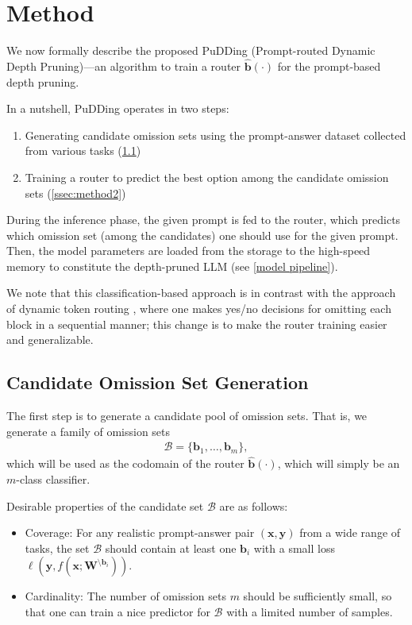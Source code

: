

\section{Method}\label{sec:method}
We now formally describe the proposed PuDDing (Prompt-routed Dynamic Depth Pruning)---an algorithm to train a router $\hat{\mathbf{b}}(\cdot)$ for the prompt-based depth pruning.

In a nutshell, PuDDing operates in two steps:
\begin{enumerate}[leftmargin=*,topsep=0pt,parsep=0pt,itemsep=1.5pt]
\item Generating candidate omission sets using the prompt-answer dataset collected from various tasks (\cref{ssec:method1})
\item Training a router to predict the best option among the candidate omission sets (\cref{ssec:method2})
\end{enumerate}

During the inference phase, the given prompt is fed to the router, which predicts which omission set (among the candidates) one should use for the given prompt. Then, the model parameters are loaded from the storage to the high-speed memory to constitute the depth-pruned LLM (see \cref{model pipeline}).

We note that this classification-based approach is in contrast with the approach of dynamic token routing \citep{wangd}, where one makes yes/no decisions for omitting each block in a sequential manner; this change is to make the router training easier and generalizable.


\subsection{Candidate Omission Set Generation}\label{ssec:method1}

The first step is to generate a candidate pool of omission sets. That is, we generate a family of omission sets
\begin{align}
\mathcal{B} = \{\mathbf{b}_1,\ldots,\mathbf{b}_m\},
\end{align}
which will be used as the codomain of the router $\hat{\mathbf{b}}(\cdot)$, which will simply be an $m$-class classifier.

Desirable properties of the candidate set $\mathcal{B}$ are as follows:
\begin{itemize}[leftmargin=*,topsep=0pt,parsep=0pt,itemsep=1.5pt]
\item Coverage: For any realistic prompt-answer pair $(\mathbf{x},\mathbf{y})$ from a wide range of tasks, the set $\mathcal{B}$ should contain at least one $\mathbf{b}_i$ with a small loss $\ell(\mathbf{y},f(\mathbf{x};\mathbf{W}^{\setminus \mathbf{b}_i}))$.
\item Cardinality: The number of omission sets $m$ should be sufficiently small, so that one can train a nice predictor for $\mathcal{B}$ with a limited number of samples.
\end{itemize}

